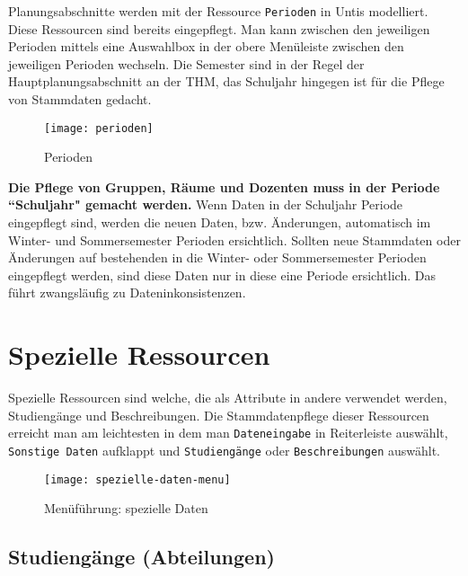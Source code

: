 Planungsabschnitte werden mit der Ressource \texttt{Perioden} in Untis modelliert. Diese Ressourcen sind bereits eingepflegt. Man kann zwischen den jeweiligen Perioden mittels eine Auswahlbox in der obere Menüleiste zwischen den jeweiligen Perioden wechseln. Die Semester sind in der Regel der Hauptplanungsabschnitt an der THM, das Schuljahr hingegen ist für die Pflege von Stammdaten gedacht.\\

\begin{wrapfigure}{r}{0.25\textwidth}
	\vspace{-4pt}
	\texttt{[image: perioden]}
	\vspace{-15pt}
	\caption{Perioden}
	\label{fig:mf-sg}
\end{wrapfigure}

\noindent
\textbf{Die Pflege von Gruppen, Räume und Dozenten muss in der Periode ``Schuljahr" gemacht werden.} Wenn Daten in der Schuljahr Periode eingepflegt sind, werden die neuen Daten, bzw. Änderungen, automatisch im Winter- und Sommersemester Perioden ersichtlich. Sollten neue Stammdaten oder Änderungen auf bestehenden in die Winter- oder Sommersemester Perioden eingepflegt werden, sind diese Daten nur in diese eine Periode ersichtlich. Das führt zwangsläufig zu Dateninkonsistenzen.\\

\section{Spezielle Ressourcen}

Spezielle Ressourcen sind welche, die als Attribute in andere verwendet werden, Studiengänge und Beschreibungen. Die Stammdatenpflege dieser Ressourcen erreicht man am leichtesten in dem man \texttt{Dateneingabe} in Reiterleiste auswählt, \texttt{Sonstige Daten} aufklappt und \texttt{Studiengänge} oder \texttt{Beschreibungen} auswählt.\\

\begin{figure}[h]
	\centering
	\texttt{[image: spezielle-daten-menu]}
	\vspace{-5pt}
	\caption{Menüführung: spezielle Daten}
	\label{fig:spezielle-daten-menu}
\end{figure}

\subsection{Studiengänge (Abteilungen)}

